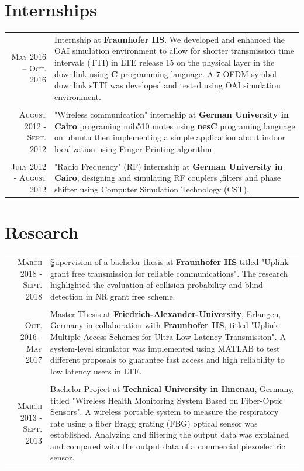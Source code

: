\documentclass[a4paper,10pt]{article}
\begin{document}
\section{Internships}
\begin{tabular}{r|p{11cm}}
	\textsc{May 2016 – Oct. 2016} & Internship at {\bf Fraunhofer IIS}. We developed and enhanced the {OAI} simulation environment to allow for shorter transmission time intervals ({TTI}) in LTE release 15 on the physical layer in the downlink using {\bf C} programming language. A 7-OFDM symbol downlink {sTTI} was developed and tested using OAI simulation environment. \\
	& \\
	\textsc{August 2012 - Sept. 2012} & "Wireless communication" internship at {\bf German University in Cairo} programing mib510 motes using \textbf{nesC} programing language on ubuntu then implementing a simple application about indoor localization using Finger Printing algorithm.\\
	& \\
	\textsc{July 2012 - August 2012} & "Radio Frequency" (RF) internship at {\bf German University in Cairo}, designing and simulating RF couplers ,filters and phase shifter using  Computer Simulation Technology (CST).\\ 
\end{tabular}

\section{Research}
\begin{tabular}{r|p{9cm}}
\textsc{March} 2018 - \textsc{Sept.} 2018 & ٍٍSupervision of a bachelor thesis at {\bf Fraunhofer IIS} titled "Uplink grant free transmission for reliable communications". The research highlighted the evaluation of collision probability and blind detection in NR grant free scheme.\\
& \\
\textsc{Oct.} 2016 - \textsc{May} 2017 & Master Thesis at {\bf Friedrich-Alexander-University}, Erlangen, Germany in collaboration with {\bf Fraunhofer IIS}, titled "Uplink Multiple Access Schemes for Ultra-Low Latency Transmission". A system-level simulator was implemented using MATLAB to test different proposals to guarantee fast access and high reliability to low latency users in LTE.\\
& \\
 \textsc{March} 2013 - \textsc{Sept.} 2013 & Bachelor Project at {\bf Technical University in Ilmenau}, Germany, titled "Wireless Health Monitoring System Based on Fiber-Optic Sensors". A wireless portable system to measure the respiratory rate using a fiber Bragg grating (FBG) optical sensor was established. Analyzing and filtering the output data was explained and compared with the output data of a commercial piezoelectric sensor.\\
\end{tabular}
\end{document}
